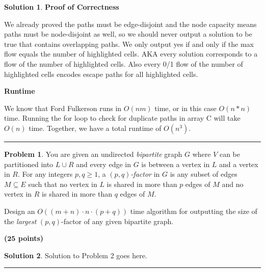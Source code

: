 \documentclass{article}
\theoremstyle{definition}
\newtheorem{problem}{Problem}
\def\fline{\rule{0.75\linewidth}{0.5pt}}
\newcommand{\finishline}{\begin{center}\fline\end{center}}
\newtheorem*{solution*}{Solution}
\newenvironment{solution}{\begin{solution*}}{{\finishline} \end{solution*}}
\newcommand{\grade}[1]{\hfill{\textbf{($\mathbf{#1}$ points)}}}
\begin{document}
\begin{solution}
	\item\textbf{Proof of Correctness}
	\item  We already proved the paths must be edge-disjoint and the node capacity means paths must be node-disjoint as well, so we should never output a solution to be true that contains overlapping paths. We only output yes if and only if the max flow equals the number of highlighted cells. AKA every solution corresponds to a flow of the number of highlighted cells. Also every 0/1 flow of the number of highlighted cells encodes escape paths for all highlighted cells. 

	\item\textbf{Runtime}
	\item We know that Ford Fulkerson runs in $O(nm)$ time, or in this case $O(n*n)$ time. Running the for loop to check for duplicate paths in array C will take $O(n)$ time. Together, we have a total runtime of $O(n^3)$.

\end{solution}

\bigskip


\begin{problem}
	You are given an undirected \emph{bipartite} graph $G$ where $V$ can be partitioned into $L \cup R$ and every edge in $G$ is between a vertex in $L$ and a vertex in $R$. 
	For any integers $p,q \geq 1$, a \emph{$(p,q)$-factor} in $G$ is any subset of edges $M \subseteq E$ such that no vertex in $L$ is shared in more than $p$ edges of $M$ and no vertex in $R$ is shared in more than $q$ edges of $M$. 
	
Design an $O((m+n) \cdot n \cdot (p+q))$ time algorithm for outputting the size of the \emph{largest} $(p,q)$-factor of any given bipartite graph. 
		
\grade{25}

\end{problem}

\begin{solution}
	Solution to Problem 2 goes here.
\end{solution}
\end{document}
